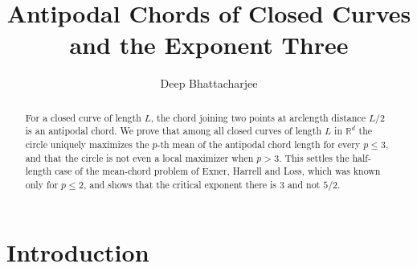 \documentclass[11pt]{amsart}
\theoremstyle{definition}
\theoremstyle{remark}
\newcommand{\R}{\mathbb{R}}
\begin{document}
\title{Antipodal Chords of Closed Curves and the Exponent Three}

\author{Deep Bhattacharjee}
\address{Formerly, Electro-Gravitational Space Propulsion Laboratory (EGSPL), Bhubaneswar, Odisha 751030, India}
\address{Formerly, University of Calcutta (Heramba Chandra College), 23/49 Gariahat Road, Golpark, Kolkata 700029, West Bengal, India}


\begin{abstract}
For a closed curve of length $L$, the chord joining two points at arclength distance $L/2$ is an antipodal chord. We prove that among all closed curves of length $L$ in $\R^d$ the circle uniquely maximizes the $p$-th mean of the antipodal chord length for every $p\le 3$, and that the circle is not even a local maximizer when $p>3$. This settles the half-length case of the mean-chord problem of Exner, Harrell and Loss, which was known only for $p\le 2$, and shows that the critical exponent there is $3$ and not $5/2$.
\end{abstract}

\maketitle

\section{Introduction}
\end{document}
